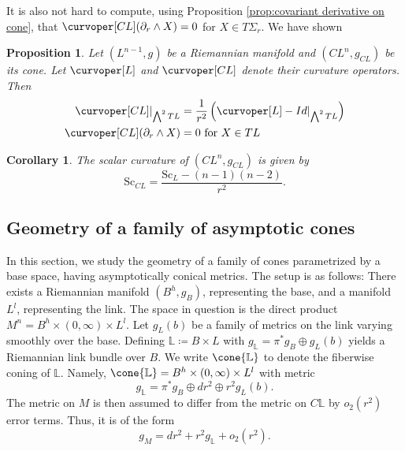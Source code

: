 \documentclass[12pt, reqno]{amsart}
\theoremstyle{plain} %
\newtheorem{proposition}[theorem]{Proposition}
\newtheorem{corollary}[theorem]{Corollary}
\theoremstyle{definition}
\theoremstyle{remark}
\numberwithin{equation}{section}
\newcommand{\bund}[1]{\mathbb{#1}}
\newcommand{\Sc}{\mathrm{Sc}}
\newcommand{\hdim}{h} %
\newcommand{\ldim}{l} %
\newcommand{\tdim}{n} %
\begin{document}
It is also not hard to compute, using Proposition \ref{prop:covariant derivative on cone}, that \(\curvoper[CL](\partial_r\wedge X)=0\) for \(X \in T\Sigma_r\).
We have shown
\begin{proposition}\label{prop:curvature of cone}
    Let \((L^{\tdim-1},g)\) be a Riemannian manifold and \((CL^{\tdim},g_{CL})\) be its cone.
    Let \(\curvoper[L]\) and \(\curvoper[CL]\) denote their curvature operators.
    Then
    \begin{align*}
        \curvoper[CL]|_{\bigwedge^2 TL} &= \frac{1}{r^2} \left(\curvoper[L] - Id|_{\bigwedge^2 TL}\right) \\
        \curvoper[CL](\partial_r\wedge X)&=0 \text{ for } X\in TL
    \end{align*}
\end{proposition}
\begin{corollary}\label{cor:scalar curvature of cone}
    The scalar curvature of \((CL^{\tdim},g_{CL})\) is given by
    \begin{equation*}
        \Sc_{CL} = \frac{\Sc_L-(n-1)(n-2)}{r^2}.
    \end{equation*}
\end{corollary}

\subsection{Geometry of a family of asymptotic cones}\label{subsec:geometry of family of asymptotic cones}
In this section, we study the geometry of a family of cones parametrized by a base space, having asymptotically conical metrics. The setup is as follows: There exists a Riemannian manifold \((B^{\hdim},g_B)\), representing the base, and a manifold \(L^{\ldim}\), representing the link.
The space in question is the direct product \(M^\tdim = B^\hdim \times (0, \infty) \times L^\ldim\).
Let \(g_L(b)\) be a family of metrics on the link varying smoothly over the base.
Defining \(\bund{L} \coloneqq B \times L\) with \(g_{\bund{L}} = \pi^*g_B \oplus g_L(b)\) yields a Riemannian link bundle over \(B\).
We write \(\cone{\bund{L}}\) to denote the fiberwise coning of \(\bund{L}\).
Namely, \(\cone{\bund{L}} = B^\hdim \times (0, \infty) \times L^\ldim\) with metric
\begin{equation*}
    g_{\bund{L}} = \pi^*g_B \oplus dr^2 \oplus r^2 g_L(b).
\end{equation*}
The metric on \(M\) is then assumed to differ from the metric on \(C\bund{L}\) by \(o_2(r^2)\) error terms.
Thus, it is of the form
\begin{equation*}
    g_M = dr^2 + r^2 g_{\bund{L}} + o_2(r^2).
\end{equation*}
\end{document}
